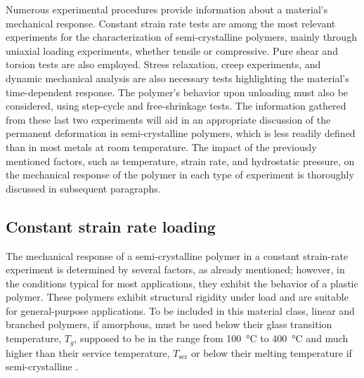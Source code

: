 Numerous experimental procedures provide information about a material's mechanical response.
Constant strain rate tests are among the most relevant experiments for the characterization of semi-crystalline polymers, mainly through uniaxial loading experiments, whether tensile or compressive.
Pure shear and torsion tests are also employed.
Stress relaxation, creep experiments, and dynamic mechanical analysis are also necessary tests highlighting the material's time-dependent response.
The polymer's behavior upon unloading must also be considered, using step-cycle and free-shrinkage tests.
The information gathered from these last two experiments will aid in an appropriate discussion of the permanent deformation in semi-crystalline polymers, which is less readily defined than in most metals at room temperature.
The impact of the previously mentioned factors, such as temperature, strain rate, and hydrostatic pressure, on the mechanical response of the polymer in each type of experiment is thoroughly discussed in subsequent paragraphs.

\subsection{Constant strain rate loading}

The mechanical response of a semi-crystalline polymer in a constant strain-rate experiment is determined by several factors, as already mentioned; however, in the conditions typical for most applications, they exhibit the behavior of a plastic polymer.
These polymers exhibit structural rigidity under load and are suitable for general-purpose applications.
To be included in this material class, linear and branched polymers, if amorphous, must be used below their glass transition temperature, $T_g$, supposed to be in the range from \SI{100}{\celsius} to \SI{400}{\celsius} and much higher than their service temperature, $T_\mathrm{ser}$ or below their melting temperature if semi-crystalline \citep{callister2014materials, arzhakovRelaxationPhysicalMechanical2019}.


